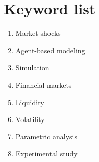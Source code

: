 \section{Keyword list}

\begin{enumerate}
    \item Market shocks
    \item Agent-based modeling
    \item Simulation
    \item Financial markets
    \item Liquidity
    \item Volatility
    \item Parametric analysis
    \item Experimental study
\end{enumerate}